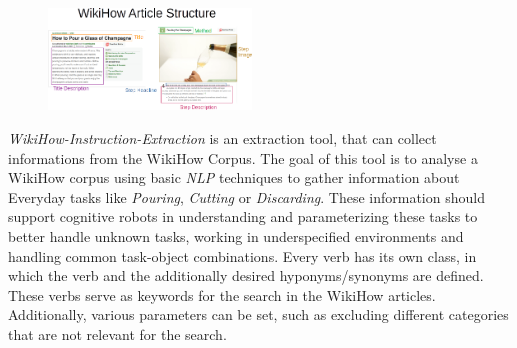 	\begin{figure}
        \centering
        \includegraphics[width=0.48\textwidth]{Graphics/WikiHow Article Structure.png}
    \end{figure}
	\textit{WikiHow-Instruction-Extraction} \cite{wikihow-extraction}  is an extraction tool, that can collect informations from the WikiHow Corpus. 
	The goal of this tool is to analyse a WikiHow corpus using basic \textit{NLP} techniques to gather information about Everyday tasks like \textit{Pouring}, \textit{Cutting} or \textit{Discarding}. 
	These information should support cognitive robots in understanding and parameterizing these tasks to better handle unknown tasks, working in underspecified environments and handling common task-object combinations.
	Every verb has its own class, in which the verb and the additionally desired hyponyms/synonyms are defined. These verbs serve as keywords for the search in the WikiHow articles. Additionally, various parameters can be set, such as excluding different categories that are not relevant for the search.